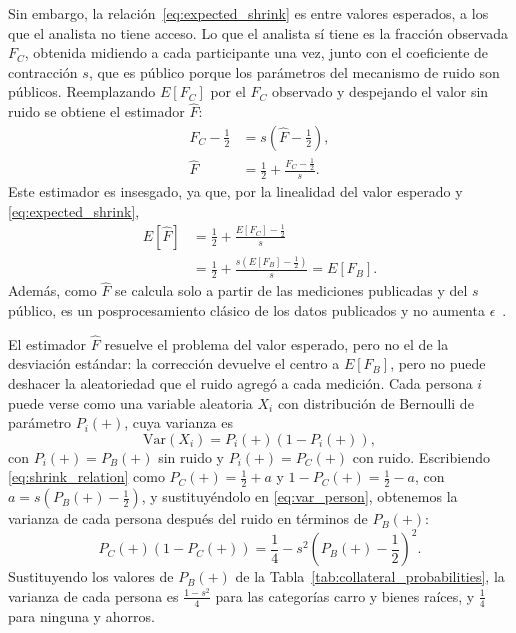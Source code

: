 \documentclass{ieeeaccess}
\begin{document}
Sin embargo, la relación~\eqref{eq:expected_shrink} es entre valores esperados, a los que el analista no tiene acceso. Lo que el analista sí tiene es la fracción observada $F_C$, obtenida midiendo a cada participante una vez, junto con el coeficiente de contracción $s$, que es público porque los parámetros del mecanismo de ruido son públicos. Reemplazando $E[F_C]$ por el $F_C$ observado y despejando el valor sin ruido se obtiene el estimador $\hat{F}$:
\begin{align}
  F_C - \tfrac{1}{2} &= s\left(\hat{F} - \tfrac{1}{2}\right), \nonumber \\
  \hat{F} &= \frac{1}{2} + \frac{F_C - \frac{1}{2}}{s}.
  \label{eq:estimator}
\end{align}
Este estimador es insesgado, ya que, por la linealidad del valor esperado y \eqref{eq:expected_shrink},
\begin{align}
  E[\hat{F}] &= \frac{1}{2} + \frac{E[F_C] - \frac{1}{2}}{s} \nonumber \\
             &= \frac{1}{2} + \frac{s\left(E[F_B] - \frac{1}{2}\right)}{s} = E[F_B].
  \label{eq:unbiased}
\end{align}
Además, como $\hat{F}$ se calcula solo a partir de las mediciones publicadas y del $s$ público, es un posprocesamiento clásico de los datos publicados y no aumenta $\epsilon$~\cite[Prop.~2.1]{dwork2014algorithmic}.

El estimador $\hat{F}$ resuelve el problema del valor esperado, pero no el de la desviación estándar: la corrección devuelve el centro a $E[F_B]$, pero no puede deshacer la aleatoriedad que el ruido agregó a cada medición. Cada persona $i$ puede verse como una variable aleatoria $X_i$ con distribución de Bernoulli de parámetro $P_i(+)$, cuya varianza es
\begin{equation}
  \mathrm{Var}(X_i) = P_i(+)\left(1 - P_i(+)\right),
  \label{eq:var_person}
\end{equation}
con $P_i(+) = P_B(+)$ sin ruido y $P_i(+) = P_C(+)$ con ruido. Escribiendo \eqref{eq:shrink_relation} como $P_C(+) = \frac{1}{2} + a$ y $1 - P_C(+) = \frac{1}{2} - a$, con $a = s\left(P_B(+) - \frac{1}{2}\right)$, y sustituyéndolo en \eqref{eq:var_person}, obtenemos la varianza de cada persona después del ruido en términos de $P_B(+)$:
\begin{equation}
  P_C(+)\left(1 - P_C(+)\right) = \frac{1}{4} - s^2\left(P_B(+) - \frac{1}{2}\right)^2.
  \label{eq:var_person_c}
\end{equation}
Sustituyendo los valores de $P_B(+)$ de la Tabla~\ref{tab:collateral_probabilities}, la varianza de cada persona es $\frac{1-s^2}{4}$ para las categorías carro y bienes raíces, y $\frac{1}{4}$ para ninguna y ahorros.
\end{document}
